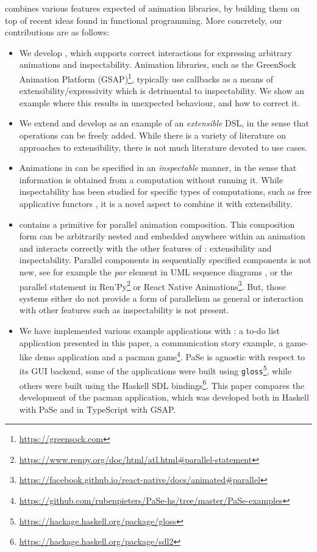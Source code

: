 \dsl{} combines various features expected of animation libraries, by building them on top of recent ideas found in functional programming. More concretely, our contributions are as follows:
\begin{itemize}
\item We develop \dsl{}, which supports correct interactions for expressing arbitrary animations and inspectability. Animation libraries, such as the GreenSock Animation Platform (GSAP)\footnote{\url{https://greensock.com}}, typically use callbacks as a means of extensibility/expressivity which is detrimental to inspectability. We show an example where this results in unexpected behaviour, and how to correct it.
\item We extend and develop \dsl{} as an example of an \emph{extensible} DSL, in the sense that operations can be freely added. While there is a variety of literature on approaches to extensibility, there is not much literature devoted to use cases.
\item Animations in \dsl{} can be specified in an \emph{inspectable} manner, in the sense that information is obtained from a computation without running it. While inspectability has been studied for specific types of computations, such as free applicative functors \cite{DBLP:journals/corr/CapriottiK14}, it is a novel aspect to combine it with extensibility.
\item \dsl{} contains a primitive for parallel animation composition. This composition form can be arbitrarily nested and embedded anywhere within an animation and interacts correctly with the other features of \dsl{}: extensibility and inspectability. Parallel components in sequentially specified components is not new, see for example the \emph{par} element in UML sequence diagrams \cite{umlspec}, or the parallel statement in Ren'Py\footnote{\url{https://www.renpy.org/doc/html/atl.html\#parallel-statement}} or React Native Animations\footnote{\url{https://facebook.github.io/react-native/docs/animated\#parallel}}. But, those systems either do not provide a form of parallelism as general or interaction with other features such as inspectability is not present.
\item We have implemented various example applications with \dsl{}: a to-do list application presented in this paper, a communication story example, a game-like demo application and a pacman game\footnote{\url{https://github.com/rubenpieters/PaSe-hs/tree/master/PaSe-examples}}. PaSe is agnostic with respect to its GUI backend, some of the applications were built using \texttt{gloss}\footnote{\url{https://hackage.haskell.org/package/gloss}}, while others were built using the Haskell SDL bindings\footnote{\url{https://hackage.haskell.org/package/sdl2}}. This paper compares the development of the pacman application, which was developed both in Haskell with PaSe and in TypeScript with GSAP.
\end{itemize}
